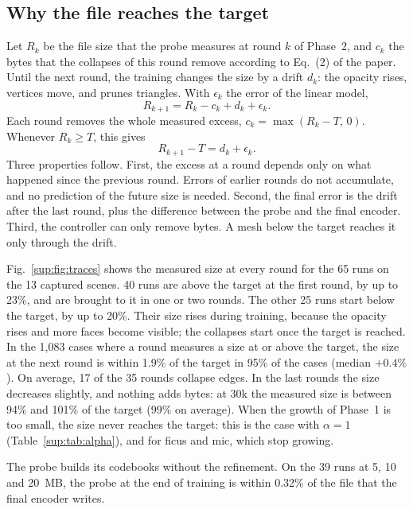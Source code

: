 \subsection{Why the file reaches the target}
Let $R_k$ be the file size that the probe measures at round $k$ of Phase~2, and $c_k$ the bytes that the collapses of this round remove according to Eq.~(2) of the paper. Until the next round, the training changes the size by a drift $d_k$: the opacity rises, vertices move, and \MS prunes triangles. With $\epsilon_k$ the error of the linear model,
\begin{equation}
R_{k+1} = R_k - c_k + d_k + \epsilon_k .
\end{equation}
Each round removes the whole measured excess, $c_k = \max(R_k - T,\, 0)$. Whenever $R_k \ge T$, this gives
\begin{equation}
R_{k+1} - T = d_k + \epsilon_k .
\label{sup:eq:excess}
\end{equation}
Three properties follow. First, the excess at a round depends only on what happened since the previous round. Errors of earlier rounds do not accumulate, and no prediction of the future size is needed. Second, the final error is the drift after the last round, plus the difference between the probe and the final encoder. Third, the controller can only remove bytes. A mesh below the target reaches it only through the drift.

Fig.~\ref{sup:fig:traces} shows the measured size at every round for the 65 runs on the 13 captured scenes. 40 runs are above the target at the first round, by up to 23\%, and are brought to it in one or two rounds. The other 25 runs start below the target, by up to 20\%. Their size rises during training, because the opacity rises and more faces become visible; the collapses start once the target is reached. In the 1{,}083 cases where a round measures a size at or above the target, the size at the next round is within 1.9\% of the target in 95\% of the cases (median $+0.4\%$). On average, 17 of the 35 rounds collapse edges. In the last rounds the size decreases slightly, and nothing adds bytes: at 30k the measured size is between 94\% and 101\% of the target (99\% on average). When the growth of Phase~1 is too small, the size never reaches the target: this is the case with $\alpha = 1$ (Table~\ref{sup:tab:alpha}), and for ficus and mic, which stop growing.

The probe builds its codebooks without the refinement. On the 39 runs at 5, 10 and 20~MB, the probe at the end of training is within 0.32\% of the file that the final encoder writes.

